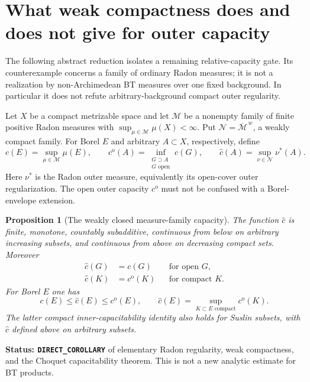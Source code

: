 \documentclass[11pt,a4paper]{article}
\numberwithin{equation}{section}
\newtheorem{proposition}[theorem]{Proposition}
\theoremstyle{definition}
\theoremstyle{remark}
\begin{document}


\section{What weak compactness does and does not give for outer capacity}
\label{sec:r3-weak-closure-capacity-attempt}

The following abstract reduction isolates a remaining relative-capacity
gate.  Its counterexample concerns a family of ordinary Radon measures;
it is not a realization by non-Archimedean BT measures over one fixed
background.  In particular it does not refute arbitrary-background
compact outer regularity.

Let $X$ be a compact metrizable space and let $\mathcal M$ be a
nonempty family of finite positive Radon measures with
$\sup_{\mu\in\mathcal M}\mu(X)<\infty$.  Put
$\mathcal N=\overline{\mathcal M}^{\,w}$, a weakly compact family.
For Borel $E$ and arbitrary $A\subset X$, respectively, define
\[
 c(E)=\sup_{\mu\in\mathcal M}\mu(E),\qquad
 c^{\mathrm o}(A)=\inf_{\substack{G\supset A\\G\text{ open}}}c(G),
 \qquad
 \widehat c(A)=\sup_{\nu\in\mathcal N}\nu^*(A).
\]
Here $\nu^*$ is the Radon outer measure, equivalently its open-cover
outer regularization.  The open outer capacity $c^{\mathrm o}$ must
not be confused with a Borel-envelope extension.

\begin{proposition}[The weakly closed measure-family capacity]
\label{prop:r3-weak-closure-capacity-facts}
The function $\widehat c$ is finite, monotone, countably subadditive,
continuous from below on arbitrary increasing subsets, and continuous
from above on decreasing compact sets.  Moreover
\begin{align}
 \widehat c(G)&=c(G)&&\text{for open }G,\label{eq:r3-closure-open}\\
 \widehat c(K)&=c^{\mathrm o}(K)&&\text{for compact }K.\label{eq:r3-closure-compact}
\end{align}
For Borel $E$ one has
\[
 c(E)\leq\widehat c(E)\leq c^{\mathrm o}(E),\qquad
 \widehat c(E)=\sup_{K\subset E\text{ compact}}c^{\mathrm o}(K).
\]
The latter compact inner-capacitability identity also holds for Suslin
subsets, with $\widehat c$ defined above on arbitrary subsets.
\end{proposition}

\noindent\textbf{Status: \texttt{DIRECT\_COROLLARY}} of elementary
Radon regularity, weak compactness, and the Choquet capacitability
theorem.  This is not a new analytic estimate for BT products.
\end{document}
